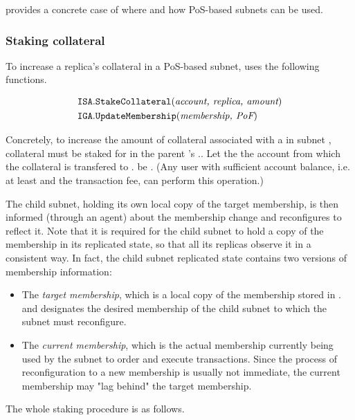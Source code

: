  provides a concrete case of where and how PoS-based subnets can be used.

\subsubsection{Staking collateral}
\label{sec:staking-collateral}

To increase a replica's collateral in a PoS-based subnet, \ipc uses the following functions.

\begin{align*}
    \texttt{ISA}.&\texttt{StakeCollateral}(\textit{account, replica, amount})\\
    \texttt{IGA}.&\texttt{UpdateMembership}(\textit{membership, \textit{PoF}})
\end{align*}

Concretely, to increase the amount of collateral associated with a  in subnet ,
collateral must be staked for  in the parent 's \saFull {}..
Let the the account from which the collateral is transfered to . be .
(Any user with sufficient account balance, i.e. at least  and the transaction fee, can perform this operation.)

The child subnet, holding its own local copy of the target membership, is then informed (through an \ipc agent) about the membership change and reconfigures to reflect it.
Note that it is required for the child subnet to hold a copy of the membership in its replicated state, so that all its replicas observe it in a consistent way.
In fact, the child subnet replicated state contains two versions of membership information:
\begin{itemize}
    \item The \emph{target membership}, which is a local copy of the membership stored in . and designates the desired membership of the child subnet
    to which the subnet must reconfigure.
    \item The \emph{current membership}, which is the actual membership currently being used by the subnet to order and execute transactions.
    Since the process of reconfiguration to a new membership is usually not immediate, the current membership may "lag behind" the target membership.
\end{itemize}
The whole staking procedure is as follows.

